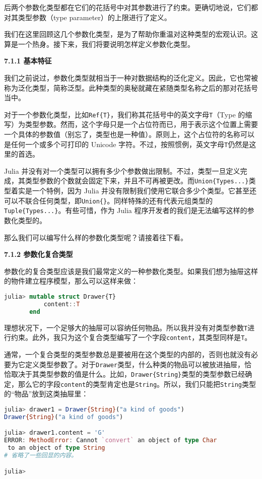 后两个参数化类型都在它们的花括号中对其参数进行了约束。更确切地说，它们都对其类型参数（type parameter）的上限进行了定义。

我们在这里回顾这几个参数化类型，是为了帮助你重温对这种类型的宏观认识。这算是一个热身。接下来，我们将要说明怎样定义参数化类型。

\textbf{7.1.1 基本特征}

我们之前说过，参数化类型就相当于一种对数据结构的泛化定义。因此，它也常被称为泛化类型，简称泛型。此种类型的奥秘就藏在紧随类型名称之后的那对花括号当中。

对于一个参数化类型，比如\verb|Ref{T}|，我们称其花括号中的英文字母\verb|T|（Type 的缩写）为类型参数。然而，这个字母只是一个占位符而已，用于表示这个位置上需要一个具体的参数值（别忘了，类型也是一种值）。原则上，这个占位符的名称可以是任何一个或多个可打印的 Unicode 字符。不过，按照惯例，英文字母\verb|T|仍然是这里的首选。

Julia 并没有对一个类型可以拥有多少个参数做出限制。不过，类型一旦定义完成，其类型参数的个数就会固定下来，并且不可再被更改。而\verb|Union{Types...}|类型着实是一个特例，因为 Julia 并没有限制我们使用它联合多少个类型。它甚至还可以不联合任何类型，即\verb|Union{}|。同样特殊的还有代表元组类型的\verb|Tuple{Types...}|。有些可惜，作为 Julia 程序开发者的我们是无法编写这样的参数化类型的。

那么我们可以编写什么样的参数化类型呢？请接着往下看。

\textbf{7.1.2 参数化复合类型}

参数化的复合类型应该是我们最常定义的一种参数化类型。如果我们想为抽屉这样的物件建立程序模型，那么可以这样来做：
\begin{lstlisting}[language=julia]
julia> mutable struct Drawer{T}
           content::T
       end 
\end{lstlisting}

理想状况下，一个足够大的抽屉可以容纳任何物品。所以我并没有对类型参数\verb|T|进行约束。此外，我只为这个复合类型编写了一个字段\verb|content|，其类型同样是\verb|T|。

通常，一个复合类型的类型参数总是要被用在这个类型的内部的，否则也就没有必要为它定义类型参数了。对于\verb|Drawer|类型，什么种类的物品可以被放进抽屉，恰恰取决于其类型参数的值是什么。比如，\verb|Drawer{String}|类型的类型参数已经确定，那么它的字段\verb|content|的类型肯定也是\verb|String|。所以，我们只能把\verb|String|类型的“物品”放到这类抽屉里：
\begin{lstlisting}[language=julia]
julia> drawer1 = Drawer{String}("a kind of goods")
Drawer{String}("a kind of goods")

julia> drawer1.content = 'G'
ERROR: MethodError: Cannot `convert` an object of type Char
 to an object of type String
# 省略了一些回显的内容。

julia> 
\end{lstlisting}

